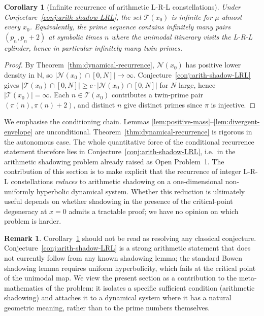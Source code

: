 \documentclass{iopjournal}
\newtheorem{corollary}{Corollary}
\theoremstyle{definition}
\newtheorem{remark}{Remark}
\begin{document}
\begin{corollary}[Infinite recurrence of arithmetic L-R-L constellations]
\label{cor:twin-conditional}
Under Conjecture~\ref{conj:arith-shadow-LRL}, the set
$\mathcal{T}(x_0)$ is infinite for $\mu$-almost every $x_0$.
Equivalently, the prime sequence contains infinitely many pairs
$(p_n, p_n + 2)$ at symbolic times $n$ where the unimodal itinerary
visits the L-R-L cylinder, hence in particular infinitely many twin
primes.
\end{corollary}
\begin{proof}
By Theorem~\ref{thm:dynamical-recurrence}, $\mathcal{N}(x_0)$ has
positive lower density in $\mathbb{N}$, so
$|\mathcal{N}(x_0) \cap [0, N]| \to \infty$. Conjecture~\ref{conj:arith-shadow-LRL}
gives $|\mathcal{T}(x_0) \cap [0, N]| \geq c \cdot |\mathcal{N}(x_0) \cap [0, N]|$
for $N$ large, hence $|\mathcal{T}(x_0)| = \infty$. Each $n \in \mathcal{T}(x_0)$
contributes a twin-prime pair $(\pi(n), \pi(n)+2)$, and distinct $n$
give distinct primes since $\pi$ is injective.
\end{proof}

We emphasise the conditioning chain. Lemmas
\ref{lem:positive-mass}--\ref{lem:divergent-envelope} are
unconditional. Theorem~\ref{thm:dynamical-recurrence} is rigorous
in the autonomous case. The whole quantitative force of the
conditional recurrence statement therefore lies in
Conjecture~\ref{conj:arith-shadow-LRL}, i.e.\ in the arithmetic
shadowing problem already raised as Open Problem~1. The contribution
of this section is to make explicit that the recurrence of integer
L-R-L constellations \emph{reduces} to arithmetic shadowing on a
one-dimensional non-uniformly hyperbolic dynamical system. Whether
this reduction is ultimately useful depends on whether shadowing in
the presence of the critical-point degeneracy at $x = 0$ admits a
tractable proof; we have no opinion on which problem is harder.

\begin{remark}
\label{rem:over-claim}
Corollary~\ref{cor:twin-conditional} should not be read as resolving
any classical conjecture. Conjecture~\ref{conj:arith-shadow-LRL} is a
strong arithmetic statement that does not currently follow from any
known shadowing lemma; the standard Bowen shadowing lemma requires
uniform hyperbolicity, which fails at the critical point of the
unimodal map. We view the present section as a contribution to the
meta-mathematics of the problem: it isolates a specific sufficient
condition (arithmetic shadowing) and attaches it to a dynamical
system where it has a natural geometric meaning, rather than to the
prime numbers themselves.
\end{remark}
\end{document}
